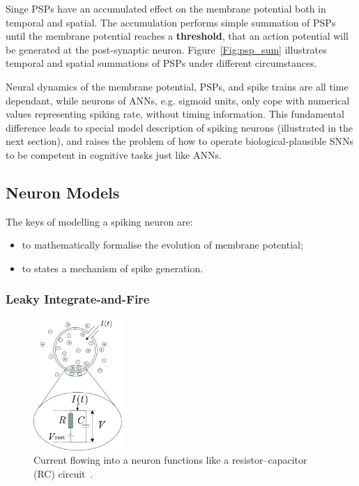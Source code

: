 Singe PSPs have an accumulated effect on the membrane potential both in temporal and spatial.
The accumulation performs simple summation of PSPs until the membrane potential reaches a \textbf{threshold}, that an action potential will be generated at the post-synaptic neuron.
Figure~\ref{Fig:psp_sum} illustrates temporal and spatial summations of PSPs under different circumstances.

Neural dynamics of the membrane potential, PSPs, and spike trains are all time dependant, while neurons of ANNs, e.g. sigmoid units, only cope with numerical values representing spiking rate, without timing information.
This fundamental difference leads to special model description of spiking neurons (illustrated in the next section), and raises the problem of how to operate biological-plausible SNNs to be competent in cognitive tasks just like ANNs.

\subsection{Neuron Models}
\label{subsec:neuron_model}
The keys of modelling a spiking neuron are: 
\begin{itemize}
	\item to mathematically formalise the evolution of membrane potential;
	\item to states a mechanism of spike generation.
\end{itemize}

\subsubsection{Leaky Integrate-and-Fire}
\begin{figure}[tb!]
	\centering
	\includegraphics[width=0.3\textwidth]{pics_snn/RC.png}
	\caption{Current flowing into a neuron functions like a resistor–capacitor (RC) circuit~\cite{gerstner2014neuronal}.}
	\label{Fig:rc}
\end{figure}

